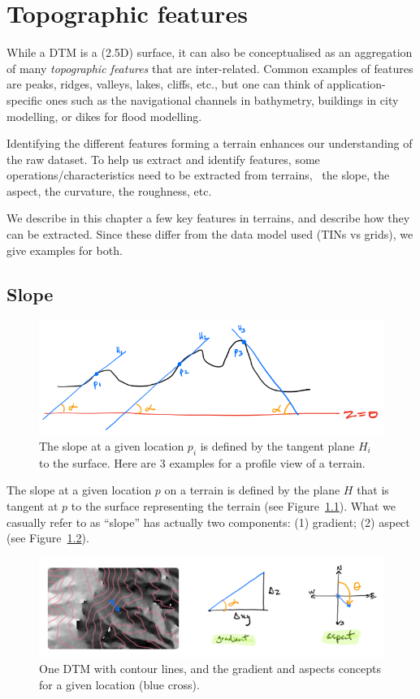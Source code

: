 
\graphicspath{{topofeatures/}}


\chapter{Topographic features}


While a DTM is a (2.5D) surface, it can also be conceptualised as an aggregation of many \emph{topographic features} that are inter-related.
Common examples of features are peaks, ridges, valleys, lakes, cliffs, etc., but one can think of application-specific ones such as the navigational channels in bathymetry, buildings in city modelling, or dikes for flood modelling.

Identifying the different features forming a terrain enhances our understanding of the raw dataset.
To help us extract and identify features, some operations/characteristics need to be extracted from terrains, \eg\ the slope, the aspect, the curvature, the roughness, etc.

We describe in this chapter a few key features in terrains, and describe how they can be extracted.
Since these differ from the data model used (TINs vs grids), we give examples for both.


%
\section{Slope}

\begin{figure}
  \centering
  \includegraphics[width=0.7\linewidth]{figs/slope_concept}
  \caption{The slope at a given location $p_i$ is defined by the tangent plane $H_i$ to the surface. Here are 3 examples for a profile view of a terrain.}
\label{fig:slope_concept}
\end{figure}

The slope at a given location $p$ on a terrain is defined by the plane $H$ that is tangent at $p$ to the surface representing the terrain (see Figure~\ref{fig:slope_concept}).
What we casually refer to as ``slope'' has actually two components: (1) gradient; (2) aspect (see Figure~\ref{fig:slope_aspect}).
\begin{figure}
  \centering
  \includegraphics[width=\linewidth]{figs/slope_aspect}
  \caption{One DTM with contour lines, and the gradient and aspects concepts for a given location (blue cross).}
\label{fig:slope_aspect}
\end{figure}


